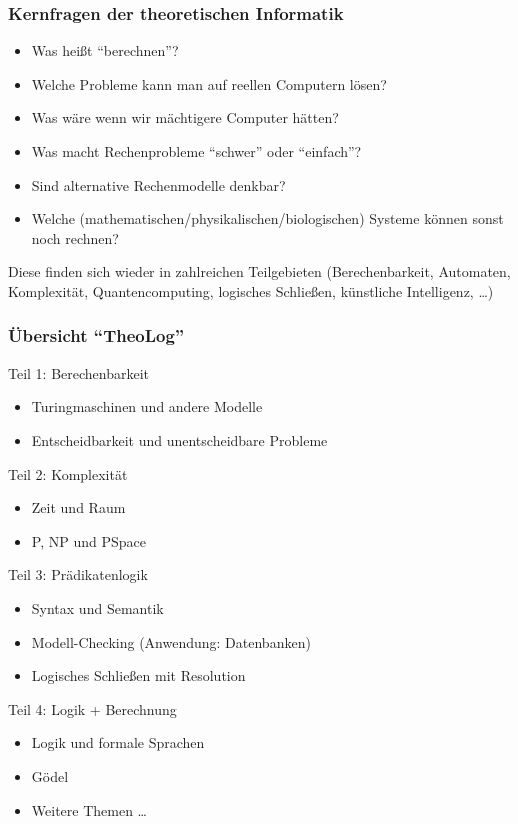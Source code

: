 \documentclass[aspectratio=1610,onlymath]{beamer}
\begin{document}
\begin{frame}\frametitle{Kernfragen der theoretischen Informatik}

\begin{itemize}
\item Was heißt "`berechnen"'?
\item Welche Probleme kann man auf reellen Computern lösen?
\item Was wäre wenn wir mächtigere Computer hätten?
\item Was macht Rechenprobleme "`schwer"' oder "`einfach"'?
\item Sind alternative Rechenmodelle denkbar?
\item Welche (mathematischen/physikalischen/biologischen) Systeme können sonst noch rechnen?
\end{itemize}

Diese finden sich wieder in zahlreichen Teilgebieten (Berechenbarkeit, Automaten, Komplexität, Quantencomputing, logisches Schließen, künstliche Intelligenz, \ldots)

\end{frame}

\begin{frame}\frametitle{Übersicht "`TheoLog"'}

\alert{Teil 1: Berechenbarkeit}
\begin{itemize}
\item Turingmaschinen und andere Modelle
\item Entscheidbarkeit und unentscheidbare Probleme
\end{itemize}

\alert{Teil 2: Komplexität}
\begin{itemize}
\item Zeit und Raum
\item P, NP und PSpace
\end{itemize}

\alert{Teil 3: Prädikatenlogik}
\begin{itemize}
\item Syntax und Semantik
\item Modell-Checking (Anwendung: Datenbanken)
\item Logisches Schließen mit Resolution
\end{itemize}

\alert{Teil 4: Logik + Berechnung}
\begin{itemize}
\item Logik und formale Sprachen
\item Gödel
\item Weitere Themen \ldots
\end{itemize}

\end{frame}
\end{document}
